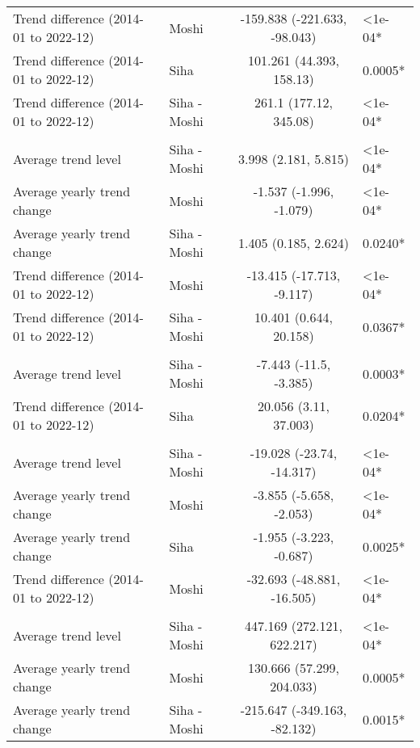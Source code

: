 \begin{longtable}{l|lcl}
Trend difference (2014-01 to 2022-12) & Moshi & -159.838 (-221.633, -98.043) & <1e-04* \\ 
Trend difference (2014-01 to 2022-12) & Siha & 101.261 (44.393, 158.13) & 0.0005* \\ 
Trend difference (2014-01 to 2022-12) & Siha - Moshi & 261.1 (177.12, 345.08) & <1e-04* \\ 
\midrule\addlinespace[2.5pt]
\multicolumn{4}{l}{Snake and Insect Bites} \\ 
\midrule\addlinespace[2.5pt]
Average trend level & Siha - Moshi & 3.998 (2.181, 5.815) & <1e-04* \\ 
Average yearly trend change & Moshi & -1.537 (-1.996, -1.079) & <1e-04* \\ 
Average yearly trend change & Siha - Moshi & 1.405 (0.185, 2.624) & 0.0240* \\ 
Trend difference (2014-01 to 2022-12) & Moshi & -13.415 (-17.713, -9.117) & <1e-04* \\ 
Trend difference (2014-01 to 2022-12) & Siha - Moshi & 10.401 (0.644, 20.158) & 0.0367* \\ 
\midrule\addlinespace[2.5pt]
\multicolumn{4}{l}{Substance Abuse} \\ 
\midrule\addlinespace[2.5pt]
Average trend level & Siha - Moshi & -7.443 (-11.5, -3.385) & 0.0003* \\ 
Trend difference (2014-01 to 2022-12) & Siha & 20.056 (3.11, 37.003) & 0.0204* \\ 
\midrule\addlinespace[2.5pt]
\multicolumn{4}{l}{Tuberculosis} \\ 
\midrule\addlinespace[2.5pt]
Average trend level & Siha - Moshi & -19.028 (-23.74, -14.317) & <1e-04* \\ 
Average yearly trend change & Moshi & -3.855 (-5.658, -2.053) & <1e-04* \\ 
Average yearly trend change & Siha & -1.955 (-3.223, -0.687) & 0.0025* \\ 
Trend difference (2014-01 to 2022-12) & Moshi & -32.693 (-48.881, -16.505) & <1e-04* \\ 
\midrule\addlinespace[2.5pt]
\multicolumn{4}{l}{Upper Respiratory Infections} \\ 
\midrule\addlinespace[2.5pt]
Average trend level & Siha - Moshi & 447.169 (272.121, 622.217) & <1e-04* \\ 
Average yearly trend change & Moshi & 130.666 (57.299, 204.033) & 0.0005* \\ 
Average yearly trend change & Siha - Moshi & -215.647 (-349.163, -82.132) & 0.0015* \\ 

\end{longtable}
